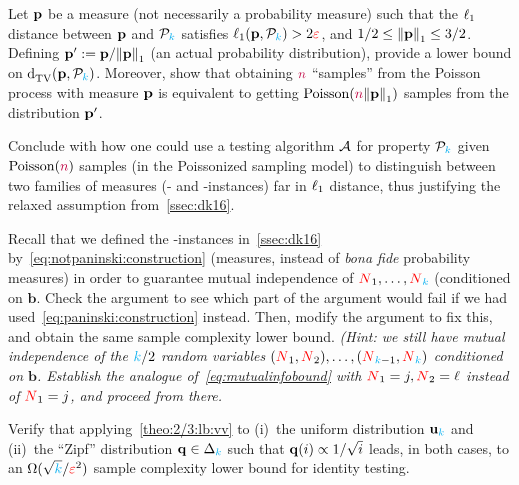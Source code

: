 \begin{question}\label{exo:notrealproba:lb}
Let $\p$ be a measure (not necessarily a probability measure) such that the $\lp[1]$ distance between $\p$ and $\property_\ab$ satisfies $\lp[1](\p,\property_\ab)>2\dst$, and $1/2\leq \normone{\p} \leq 3/2$. Defining $\p' \eqdef \p/\normone{\p}$ (an actual probability distribution), provide a lower bound on $\totalvardist{\p}{\property_\ab}$. Moreover, show that obtaining $\ns$ ``samples'' from the Poisson process with measure $\p$ is equivalent to getting $\poisson{\ns\normone{\p}}$ samples from the distribution $\p'$.

Conclude with how one could use a testing algorithm $\Algo$ for property $\property_\ab$ given $\poisson{\ns}$ samples (\ie in the Poissonized sampling model) to distinguish between two families of measures (\yes- and \no-instances) far in $\lp[1]$ distance, thus justifying the relaxed assumption from~\cref{ssec:dk16}.
\end{question}

\begin{question}[$\star$]\label{exo:paninski:mi:lb}
Recall that we defined the \no-instances in~\cref{ssec:dk16} by~\cref{eq:notpaninski:construction} (measures, instead of \emph{bona fide} probability measures) in order to guarantee mutual independence of $\occur_1,\dots,\occur_\ab$ (conditioned on $\mathbf{b}$. Check the argument to see which part of the argument would fail if we had used~\cref{eq:paninski:construction} instead. Then, modify the argument to fix this, and obtain the same sample complexity lower bound. \textit{(Hint: we still have mutual independence of the $\ab/2$ random variables $(\occur_1, \occur_2),\dots,(\occur_{\ab-1}, \occur_\ab)$ conditioned on $\mathbf{b}$. Establish the analogue of~\cref{eq:mutualinfobound} with $\occur_1=j,\occur_2=\ell$ instead of $\occur_1=j$, and proceed from there.}
\end{question}

\begin{question}\label{ex:2/3:lb:applications}
Verify that applying~\cref{theo:2/3:lb:vv} to (i)~the uniform distribution $\uniform_\ab$ and (ii)~the ``Zipf'' distribution $\q\in\distribs{\ab}$ such that $\q(i) \propto 1/\sqrt{i}$ leads, in both cases, to an $\Omega(\sqrt{\ab}/\dst^2)$ sample complexity lower bound for identity testing.
\end{question}

